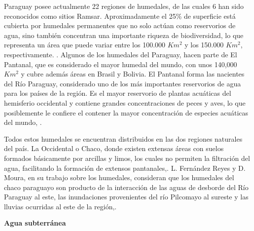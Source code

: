 Paraguay posee actualmente 22 regiones de humedales, de las cuales 6 han sido reconocidos como sitios Ramsar. Aproximadamente el 25\% de superficie está cubierta por humedales permanentes que no solo actúan como reservorios de agua, sino también concentran una importante
riqueza de biodiversidad, lo que representa un \'area que puede variar entre los 100.000 $Km^2$ y los 150.000 $Km^2$, respectivamente. \cite{mereles1998humedales}.
Algunos de los humedales del Paraguay, hacen parte de El Pantanal, que es considerado el mayor humedal del mundo, con unos 140,000 $Km^2$ y cubre además \'areas en Brasil y Bolivia. El Pantanal forma las nacientes del R\'io Paraguay, considerado uno de los m\'as importantes reservorios de agua para los pa\'ises de la regi\'on.
Es el mayor reservorio de plantas acu\'aticas del hemisferio occidental y contiene grandes concentraciones de peces y aves, lo que posiblemente le confiere el contener la mayor concentraci\'on de especies acu\'aticas del mundo, \cite{willink2000biological}.

Todos estos humedales se encuentran distribuidos en las dos regiones naturales del pa\'is. La Occidental o Chaco, donde existen extensas \'areas con suelos formados b\'asicamente por arcillas y limos, los cuales no permiten la filtraci\'on del agua, facilitando la formaci\'on de extensos pantanales,\cite{vera2000iniciativas}.
L. Fernández Reyes y D. Moura, en su trabajo sobre los humedales, consideran que los humedales del chaco paraguayo son producto de la interacci\'on de las aguas de desborde del R\'io Paraguay al este, las inundaciones provenientes del r\'io Pilcomayo al sureste y las lluvias ocurridas al este de la regi\'on,\cite{fernandez2005humedales}.

\textbf{Agua subterránea}


